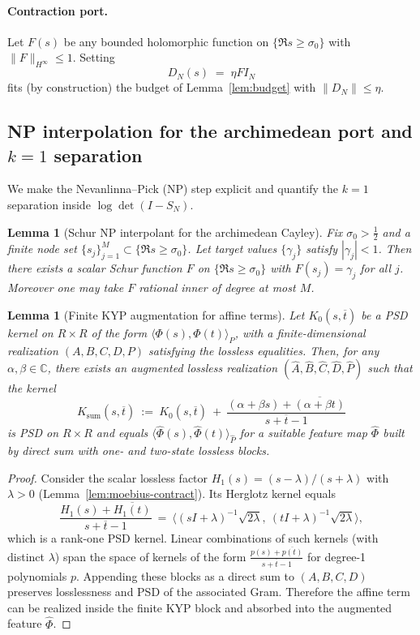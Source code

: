 \documentclass[11pt]{article}
\newtheorem{lemma}[theorem]{Lemma}
\theoremstyle{definition}
\theoremstyle{remark}
\newcommand{\C}{\mathbb{C}}
\begin{document}
\paragraph{Contraction port.}
Let $F(s)$ be any bounded holomorphic function on $\{\Re s\ge \sigma_0\}$ with $\|F\|_{H^\infty}\le 1$. Setting
\[
 D_N(s)\;=\;\eta F I_N
\]
fits (by construction) the budget of Lemma~\ref{lem:budget} with $\|D_N\|\le \eta$.

\subsection{NP interpolation for the archimedean port and $k=1$ separation}\label{subsec:NP-arch}
We make the Nevanlinna--Pick (NP) step explicit and quantify the $k=1$ separation inside $\log\det(I-S_N)$.

\begin{lemma}[Schur NP interpolant for the archimedean Cayley]
Fix $\sigma_0>\tfrac12$ and a finite node set $\{s_j\}_{j=1}^{M}\subset\{\Re s\ge \sigma_0\}$. Let target values $\{\gamma_j\}$ satisfy $|\gamma_j|<1$. Then there exists a scalar Schur function $F$ on $\{\Re s\ge \sigma_0\}$ with $F(s_j)=\gamma_j$ for all $j$. Moreover one may take $F$ rational inner of degree at most $M$.
\end{lemma}

\begin{lemma}[Finite KYP augmentation for affine terms]\label{lem:affine-gram}
Let \(K_0(s,\overline t)\) be a PSD kernel on \(R\times R\) of the form \(\langle \Phi(s),\Phi(t)\rangle_{P}\), with a finite-dimensional realization \((A,B,C,D,P)\) satisfying the lossless equalities. Then, for any \(\alpha,\beta\in\C\), there exists an augmented lossless realization \((\widehat A,\widehat B,\widehat C,\widehat D,\widehat P)\) such that the kernel
\[
 K_\mathrm{sum}(s,\overline t)\ :=\ K_0(s,\overline t)\ +\ \frac{(\alpha+\beta s)+\overline{(\alpha+\beta t)}}{s+\overline t -1}
\]
is PSD on \(R\times R\) and equals \(\langle \widehat\Phi(s),\widehat\Phi(t)\rangle_{\widehat P}\) for a suitable feature map \(\widehat\Phi\) built by direct sum with one- and two-state lossless blocks.
\end{lemma}
\begin{proof}
Consider the scalar lossless factor \(H_1(s)=(s-\lambda)/(s+\lambda)\) with \(\lambda>0\) (Lemma~\ref{lem:moebius-contract}). Its Herglotz kernel equals
\[\frac{H_1(s)+\overline{H_1(t)}}{s+\overline t -1}\ =\ \Big\langle (sI+\lambda)^{-1}\sqrt{2\lambda},\ (tI+\lambda)^{-1}\sqrt{2\lambda}\Big\rangle,\]
which is a rank-one PSD kernel. Linear combinations of such kernels (with distinct \(\lambda\)) span the space of kernels of the form \(\frac{p(s)+\overline{p(t)}}{s+\overline t-1}\) for degree-1 polynomials \(p\). Appending these blocks as a direct sum to \((A,B,C,D)\) preserves losslessness and PSD of the associated Gram. Therefore the affine term can be realized inside the finite KYP block and absorbed into the augmented feature \(\widehat\Phi\).
\end{proof}
\end{document}
